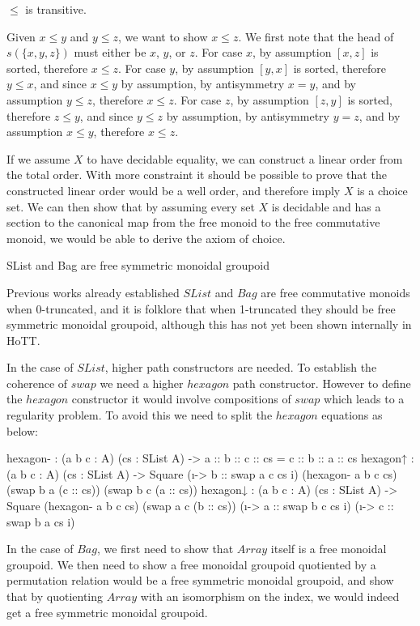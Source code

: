 \documentclass{article}
\newenvironment{code}{\verbatim}{\endverbatim}
\begin{document}
\begin{mythm}
    $\leq$ is transitive.
\end{mythm}
    Given $x \leq y$ and $y \leq z$, we want to show $x \leq z$. We first note that the head of $s(\{x,y,z\})$
    must either be $x$, $y$, or $z$.
    For case $x$, by assumption $[x, z]$ is sorted, therefore $x \leq z$.
    For case $y$, by assumption $[y, x]$ is sorted, therefore $y \leq x$, and since $x \leq y$ by assumption,
    by antisymmetry $x = y$, and by assumption $y \leq z$, therefore $x \leq z$.
    For case $z$, by assumption $[z, y]$ is sorted, therefore $z \leq y$, and since $y \leq z$ by assumption,
    by antisymmetry $y = z$, and by assumption $x \leq y$, therefore $x \leq z$.

If we assume $X$ to have decidable equality, we can construct a linear order from the total order.
With more constraint it should be possible to prove that the constructed linear order would be a well order, and therefore imply $X$ is a choice
set. We can then show that by assuming every set $X$ is decidable and has a section to the canonical map from the free monoid to the free commutative monoid, we
would be able to derive the axiom of choice.

\begin{myconj}
    SList and Bag are free symmetric monoidal groupoid
\end{myconj}
Previous works already established $SList$ and $Bag$ are free commutative
monoids when 0-truncated, and it is folklore that when 1-truncated they should be free symmetric monoidal groupoid, although
this has not yet been shown internally in HoTT. 

In the case of $SList$, higher path constructors are needed. To establish the coherence of $swap$ we need a higher $hexagon$
path constructor. However to define the $hexagon$ constructor it would involve compositions of $swap$ which leads to a regularity
problem. To avoid this we need to split the $hexagon$ equations as below:

\begin{code}
  hexagon- : (a b c : A) (cs : SList A)
           -> a :: b :: c :: cs = c :: b :: a :: cs
  hexagon↑ : (a b c : A) (cs : SList A)
           -> Square (\i -> b :: swap a c cs i) (hexagon- a b c cs)
                     (swap b a (c :: cs)) (swap b c (a :: cs))
  hexagon↓ : (a b c : A) (cs : SList A)
           -> Square (hexagon- a b c cs) (swap a c (b :: cs))
                     (\i -> a :: swap b c cs i) (\i -> c :: swap b a cs i)
\end{code}


In the case of $Bag$, we first need to show that $Array$ itself is a free monoidal groupoid. We then need to show a free
monoidal groupoid quotiented by a permutation relation would be a free symmetric monoidal groupoid, and show that by quotienting
$Array$ with an isomorphism on the index, we would indeed get a free symmetric monoidal groupoid.

\printbibliography
\end{document}
